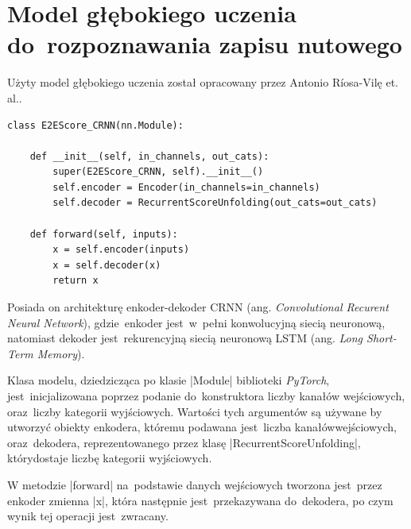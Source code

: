 \section{Model głębokiego uczenia do~rozpoznawania zapisu nutowego} \label{Model}
Użyty model głębokiego uczenia został opracowany przez Antonio Ríosa-Vilę et. al.\cite{Rios-Vila2023}. 

\begin{lstlisting}[caption={\pyth|E2EScore_CRNN| - klasa modelu głębokiego uczenia do~rozpoznawania zapisu nutowego.}, label={E2E-CRNN}]
class E2EScore_CRNN(nn.Module):

	def __init__(self, in_channels, out_cats):
		super(E2EScore_CRNN, self).__init__()
		self.encoder = Encoder(in_channels=in_channels)		
		self.decoder = RecurrentScoreUnfolding(out_cats=out_cats)
	
	def forward(self, inputs):
		x = self.encoder(inputs)
		x = self.decoder(x)
		return x
\end{lstlisting}

Posiada on architekturę enkoder-dekoder CRNN (ang. \textit{Convolutional Recurent Neural Network}), gdzie~enkoder jest~w~pełni konwolucyjną siecią neuronową, natomiast dekoder jest~rekurencyjną siecią neuronową LSTM (ang. \textit{Long Short-Term Memory}).

Klasa modelu, dziedzicząca po klasie \pyth|Module| biblioteki \textit{PyTorch}, jest~inicjalizowana poprzez podanie do~konstruktora liczby kanałów wejściowych, oraz~liczby kategorii wyjściowych. Wartości tych argumentów są używane by utworzyć obiekty enkodera, któremu podawana jest~liczba kanałów\linebreak wejściowych, oraz~dekodera, reprezentowanego przez klasę \pyth|RecurrentScoreUnfolding|, który\linebreak dostaje liczbę kategorii wyjściowych.

W metodzie \pyth|forward| na~podstawie danych wejściowych tworzona jest~przez enkoder zmienna \pyth|x|, która następnie jest~przekazywana do~dekodera, po czym wynik tej operacji jest~zwracany.

\newpage

